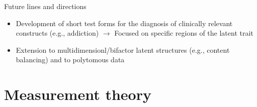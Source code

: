 \documentclass[aspectratio=149, xcolor=table]{beamer}
\begin{document}
\begin{frame}{Future lines and directions}

\begin{itemize}
	\item Development of short test forms for the diagnosis of clinically relevant constructs (e.g., addiction) $\rightarrow$ Focused on specific regions of the latent trait
	
	
\item Extension to multidimensionl/bifactor latent structures (e.g., content balancing) and to polytomous data
\end{itemize}

\end{frame}

\section{Measurement theory}
\end{document}
